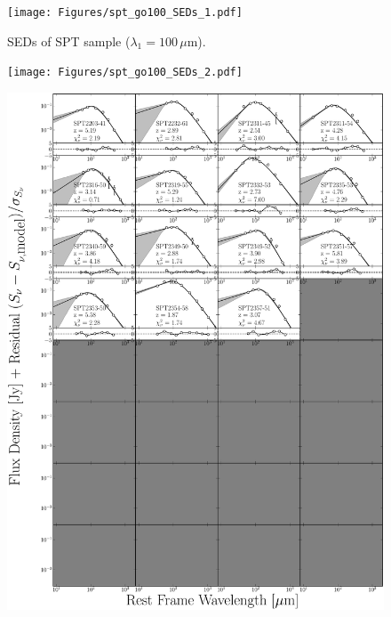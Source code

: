 \begin{figure}
	\centering
	\caption[SEDs of SPT sample ($\lambda_1 = 100\,\mu$m)]{SEDs of SPT sample ($\lambda_1 = 100\,\mu$m).}
	\texttt{[image: Figures/spt\_go100\_SEDs\_1.pdf]}
\end{figure}
\begin{figure}
	\centering
	\texttt{[image: Figures/spt\_go100\_SEDs\_2.pdf]}
\end{figure}
\begin{figure}
	\centering
	\includegraphics[width=\columnwidth]{Figures/spt_go100_SEDs_3.pdf}
\end{figure}


